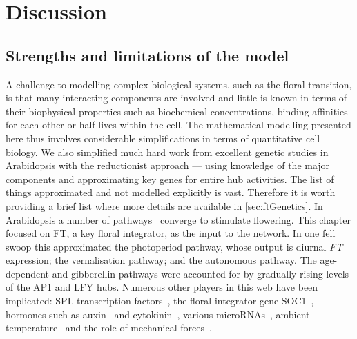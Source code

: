\section{Discussion}

\subsection{Strengths and limitations of the model}

A challenge to modelling complex biological systems, such as the floral transition, is that many interacting components are involved and little is known in terms of their biophysical properties such as biochemical concentrations, binding affinities for each other or half lives within the cell.
The mathematical modelling presented here thus involves considerable simplifications in terms of quantitative cell biology.
We also simplified much hard work from excellent genetic studies in Arabidopsis with the reductionist approach --- using knowledge of the major components and approximating key genes for entire hub activities.
The list of things approximated and not modelled explicitly is vast.
Therefore it is worth providing a brief list where more details are available in \autoref{sec:ftGenetics}.
In Arabidopsis a number of pathways~\cite{simpson2002,srikanth2011} converge to stimulate flowering.
This chapter focused on FT, a key floral integrator, as the input to the network.
In one fell swoop this approximated the photoperiod pathway, whose output is diurnal \emph{FT} expression; the vernalisation pathway; and the autonomous pathway.
The age-dependent and gibberellin pathways were accounted for by gradually rising levels of the AP1 and LFY hubs.
Numerous other players in this web have been implicated: SPL transcription factors~\cite{wang2009,yamaguchi2009}, the floral integrator gene SOC1~\cite{liu2008}, hormones such as auxin~\cite{yamaguchi2013} and cytokinin~\cite{daloia2011}, various microRNAs~\cite{schmid2003}, ambient temperature~\cite{blazquez2003,kumar2012, balasubramanian2006} and the role of mechanical forces~\cite{hamant2008}.

